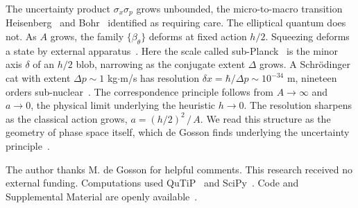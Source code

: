 \documentclass[aps,prl,reprint,amsmath,amssymb,floatfix,nofootinbib]{revtex4-2}
\begin{document}
The uncertainty product $\sigma_x \sigma_p$ grows unbounded, the micro-to-macro transition Heisenberg~\cite{heisenberg1927} and Bohr~\cite{bohr1928} identified as requiring care. The elliptical quantum does not. As $A$ grows, the family $\{\beta_\theta\}$ deforms at fixed action $h/2$. Squeezing deforms a state by external apparatus~\cite{walls1983}. Here the scale called sub-Planck~\cite{zurek2001} is the minor axis $\delta$ of an $h/2$ blob, narrowing as the conjugate extent $\Delta$ grows. A Schr\"odinger cat with extent $\Delta p \sim 1$ kg$\cdot$m/s has resolution $\delta x = \hbar/\Delta p \sim 10^{-34}$ m, nineteen orders sub-nuclear~\cite{schrodinger1935trimmer}. The correspondence principle follows from $A \to \infty$ and $a \to 0$, the physical limit underlying the heuristic $h \to 0$. The resolution sharpens as the classical action grows, $a = (h/2)^2 \,/ \,A$. We read this structure as the geometry of phase space itself, which de Gosson finds underlying the uncertainty principle~\cite{degossonluef2009irruption}.

\begin{acknowledgments}
The author thanks M. de Gosson for helpful comments. This research received no external funding. Computations used QuTiP~\cite{qutip5} and SciPy~\cite{scipy}. Code and Supplemental Material are openly available~\cite{zenododeposit}.
\end{acknowledgments}


\end{document}
